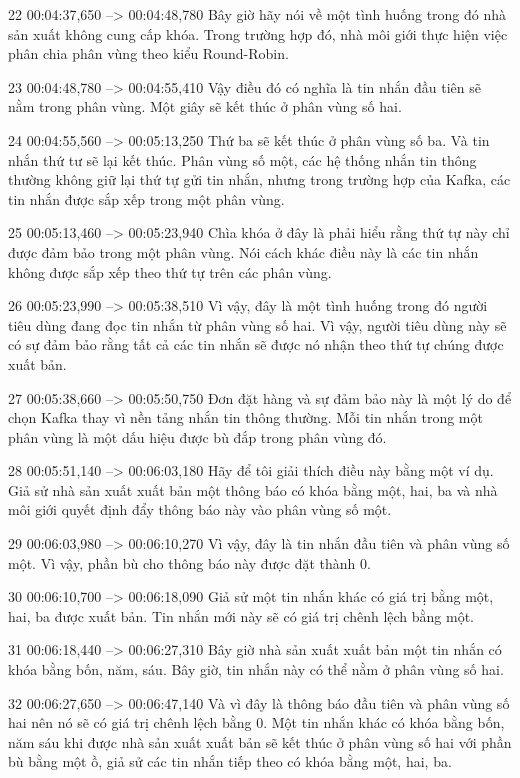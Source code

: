 22
00:04:37,650 --> 00:04:48,780
Bây giờ hãy nói về một tình huống trong đó nhà sản xuất không cung cấp khóa.  Trong trường hợp đó, nhà môi giới thực hiện việc phân chia phân vùng theo kiểu Round-Robin.

23
00:04:48,780 --> 00:04:55,410
Vậy điều đó có nghĩa là tin nhắn đầu tiên sẽ nằm trong phân vùng.  Một giây sẽ kết thúc ở phân vùng số hai.

24
00:04:55,560 --> 00:05:13,250
Thứ ba sẽ kết thúc ở phân vùng số ba.  Và tin nhắn thứ tư sẽ lại kết thúc.  Phân vùng số một, các hệ thống nhắn tin thông thường không giữ lại thứ tự gửi tin nhắn, nhưng trong trường hợp của Kafka, các tin nhắn được sắp xếp trong một phân vùng.

25
00:05:13,460 --> 00:05:23,940
Chìa khóa ở đây là phải hiểu rằng thứ tự này chỉ được đảm bảo trong một phân vùng.  Nói cách khác điều này là các tin nhắn không được sắp xếp theo thứ tự trên các phân vùng.

26
00:05:23,990 --> 00:05:38,510
Vì vậy, đây là một tình huống trong đó người tiêu dùng đang đọc tin nhắn từ phân vùng số hai.  Vì vậy, người tiêu dùng này sẽ có sự đảm bảo rằng tất cả các tin nhắn sẽ được nó nhận theo thứ tự chúng được xuất bản.

27
00:05:38,660 --> 00:05:50,750
Đơn đặt hàng và sự đảm bảo này là một lý do để chọn Kafka thay vì nền tảng nhắn tin thông thường.  Mỗi tin nhắn trong một phân vùng là một dấu hiệu được bù đắp trong phân vùng đó.

28
00:05:51,140 --> 00:06:03,180
Hãy để tôi giải thích điều này bằng một ví dụ.  Giả sử nhà sản xuất xuất bản một thông báo có khóa bằng một, hai, ba và nhà môi giới quyết định đẩy thông báo này vào phân vùng số một.

29
00:06:03,980 --> 00:06:10,270
Vì vậy, đây là tin nhắn đầu tiên và phân vùng số một.  Vì vậy, phần bù cho thông báo này được đặt thành 0.

30
00:06:10,700 --> 00:06:18,090
Giả sử một tin nhắn khác có giá trị bằng một, hai, ba được xuất bản.  Tin nhắn mới này sẽ có giá trị chênh lệch bằng một.

31
00:06:18,440 --> 00:06:27,310
Bây giờ nhà sản xuất xuất bản một tin nhắn có khóa bằng bốn, năm, sáu.  Bây giờ, tin nhắn này có thể nằm ở phân vùng số hai.

32
00:06:27,650 --> 00:06:47,140
Và vì đây là thông báo đầu tiên và phân vùng số hai nên nó sẽ có giá trị chênh lệch bằng 0.  Một tin nhắn khác có khóa bằng bốn, năm sáu khi được nhà sản xuất xuất bản sẽ kết thúc ở phân vùng số hai với phần bù bằng một ồ, giả sử các tin nhắn tiếp theo có khóa bằng một, hai, ba.

